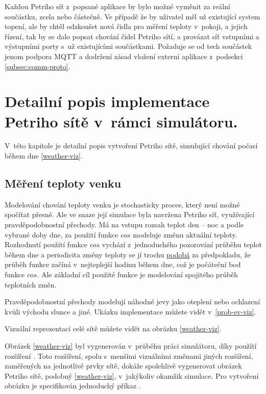 Každou Petriho síť z~popsané aplikace by bylo možné vyměnit za reální součástku, zcela nebo částečně. Ve případě že by uživatel měl už existující system topení, ale by chtěl odzkoušet nová čidla pro měření teploty v~pokoji, a jejich řízení, tak by se dalo popsat chování čidel Petriho sítí, a provázat síť vstupními a výstupními porty s~už existujícími součástkami. Požaduje se od tech součástek jenom podpora MQTT a dodržení zásad vložení externí aplikace z~podsekci \ref{subsec:comm-proto}.

\chapter{Detailní popis implementace Petriho sítě v~rámci simulátoru.}
\label{chap:postup}

V~této kapitole je detailní popis vytvoření Petriho sítě, simulující chování počasí během dne \ref{weather-viz}.

\section{Měření teploty venku}
\label{sec:mereni-teploty}
Modelování chování teploty venku je stochasticky proces, který není možné spočítat přesně. Ale ve snaze její simulace byla navržena Petriho síť, využívající pravděpodobnostní přechody. Má na vstupu rozsah teplot den -- noc a podle vybrané doby dne, za použití funkce $cos$ modeluje změnu aktuální teploty. Rozhodnutí použití funkce $cos$ vychází z~jednoduchého pozorování průběhu teplot během dne a periodicita změny teploty se jí trochu \href{https://forecast.weather.gov/MapClick.php?lat=42.3758&lon=-71.1187&lg=english&FcstType=graphical}{podobá} za předpokladu, že průběh funkce začíná v~nejteplejší hodinu během dne, což je počáteční bod funkce $cos$. Ale základní cíl použité funkce je modelování spojitého průběh teplotních změn.

Pravděpodobnostní přechody modelují náhodné jevy jako oteplení nebo ochlazení kvůli východu slunce a jiné. Ukázku implementace můžete vidět v~\ref{prob-ev-viz}.

Vizuální reprezentací celé sítě můžete vidět na obrázku \ref{weather-viz}.

Obrázek \ref{weather-viz} byl vygenerován v~průběhu práci simulátoru, díky použítí rozšíření \href{https://www.ibisc.univ-evry.fr/~fpommereau/SNAKES/API/plugins/gv.html}{}. Toto rozšíření, spolu s~menšími vizuálními změnami jiných rozšíření, zaměřených na jednotlivé prvky sítě, dokáže spolehlivě vygenerovat obrázek Petriho sítě, podobný \ref{weather-viz}, v~jakýkoliv okamžik simulace. Pro vytvoření obrázku je specifikován jednoduchý příkaz .


